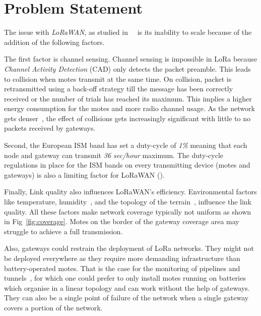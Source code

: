 


\section{Problem Statement}

The issue with \emph{LoRaWAN}, as studied 
in~\cite{8030482}~\cite{10.1145/2988287.2989163} is its inability to scale
because of the addition of the following factors.

The first factor is channel sensing.
Channel sensing is impossible in LoRa because \emph{Channel Activity Detection}
(CAD) only detects the packet preamble. %
This leads to collision when motes transmit at the same time.
On collision, packet is retransmitted using a back-off strategy till the
message has been correctly received or the number of trials has reached its
maximum.
This implies a higher energy consumption for the motes and more radio 
channel usage.
As the network gets denser~\cite{8030482}, the effect of collisions gets
increasingly significant with little to no packets received by gateways.


Second, the European ISM band has set a duty-cycle of \emph{1\%} meaning that 
each node and gateway can transmit \emph{36 sec/hour} maximum. 
The duty-cycle regulations in place for the ISM bands on every
transmitting device (motes and gateways) is also a limiting factor 
for LoRaWAN (\cite{8030482}).


Finally, Link quality also influences LoRaWAN's efficiency. 
Environmental factors like temperature,
humidity~\cite{evaluation_of_the_reliability_of_lora}, and the topology of the
terrain~\cite{lorajambalaya}, influence the link quality.
All these factors make network coverage typically not uniform 
as shown in Fig~\ref{fig:coverage}.
Motes on the border of the gateway coverage area may struggle to
achieve a full transmission. 

Also, gateways could restrain the deployment of LoRa networks.
They might not be deployed everywhere as they require more demanding infrastructure 
than battery-operated motes.
That is the case for the monitoring of pipelines and tunnels~\cite{Abrardo_2019},
for which one could prefer to only install motes running on batteries 
which organise in a linear topology and can work without the help of gateways.
They can also be a single point of failure of the network when a single
gateway covers a portion of the network. 

